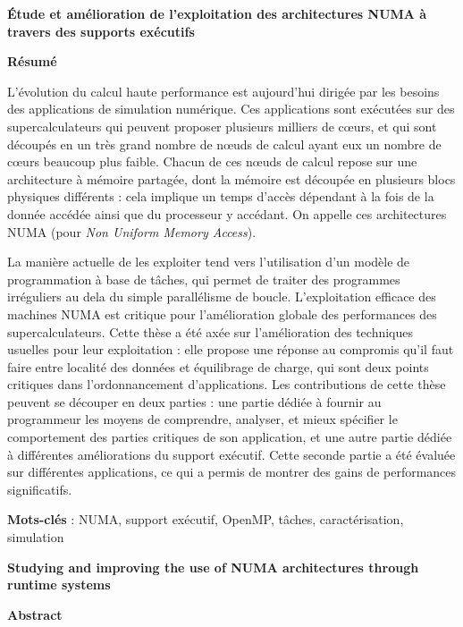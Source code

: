 \MakeUGthesePDG

\clearpage
\ifodd\value{page}\hbox{}\newpage\fi

\begin{center}\textbf{\large Étude et amélioration de l'exploitation des architectures NUMA à travers des supports exécutifs}

\quad

\textbf{Résumé}
\end{center}

L'évolution du calcul haute performance est aujourd'hui dirigée par les besoins des applications de simulation numérique.
Ces applications sont exécutées sur des supercalculateurs qui peuvent proposer plusieurs milliers de cœurs, et qui sont découpés en un très grand nombre de nœuds de calcul ayant eux un nombre de cœurs beaucoup plus faible.
Chacun de ces nœuds de calcul repose sur une architecture à mémoire partagée, dont la mémoire est découpée en plusieurs blocs physiques différents : cela implique un temps d'accès dépendant à la fois de la donnée accédée ainsi que du processeur y accédant.
On appelle ces architectures NUMA (pour \emph{Non Uniform Memory Access}).

La manière actuelle de les exploiter tend vers l'utilisation d'un modèle de programmation à base de tâches, qui permet de traiter des programmes irréguliers au dela du simple parallélisme de boucle.
L'exploitation efficace des machines NUMA est critique pour l'amélioration globale des performances des supercalculateurs.
Cette thèse a été axée sur l'amélioration des techniques usuelles pour leur exploitation : elle propose une réponse au compromis qu'il faut faire entre localité des données et équilibrage de charge, qui sont deux points critiques dans l'ordonnancement d'applications.
Les contributions de cette thèse peuvent se découper en deux parties : une partie dédiée à fournir au programmeur les moyens de comprendre, analyser, et mieux spécifier le comportement des parties critiques de son application, et une autre partie dédiée à différentes améliorations du support exécutif.
Cette seconde partie a été évaluée sur différentes applications, ce qui a permis de montrer des gains de performances significatifs.



\quad

\textbf{Mots-clés} : NUMA, support exécutif, OpenMP, tâches, caractérisation, simulation

\begin{center}\textbf{\large Studying and improving the use of NUMA architectures through runtime systems }

\quad

\textbf{Abstract}
\end{center}


